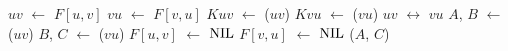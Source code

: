 \begin{algorithm}[htb]
\caption{\dymForestDelEdge($F$, $u$, $v$)}
\label{Algo:dymForestDelEdge}
\begin{algorithmic}[1]
\State $uv$ $\gets$ $F[u,v]$
\State $vu$ $\gets$ $F[v,u]$ 
\State $Kuv$ $\gets$ \treapOrder($uv$)
\State $Kvu$ $\gets$ \treapOrder($vu$) 
    \State $uv$ $\leftrightarrow$ $vu$
\EndIf
\State $A$, $B$ $\gets$ \treapSplit($uv$)
\State $B$, $C$ $\gets$ \treapSplit($vu$)
\State $F[u,v]$ $\gets$ $\text{NIL}{}$
\State $F[v,u]$ $\gets$ $\text{NIL}{}$
\State \treapJoin($A$, $C$)
\end{algorithmic}
\end{algorithm}





